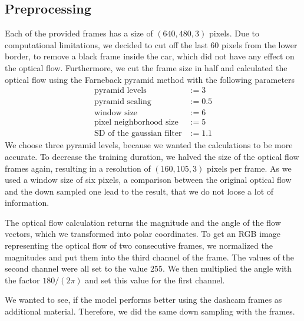 \documentclass[conference]{IEEEtran}
\begin{document}
\subsection{Preprocessing}
Each of the provided frames has a size of $(640,480,3)$ pixels. Due to computational limitations, we decided to cut off the last 60 pixels from the lower border, to remove a black frame inside the car, which did not have any effect on the optical flow. Furthermore, we cut the frame size in half and calculated the optical flow using the Farneback pyramid \cite{Farneback2003} method with the following parameters
\begin{align*}
\text{pyramid levels} &:= 3\\
\text{pyramid scaling} &:= 0.5\\
\text{window size} &:= 6\\
\text{pixel neighborhood size} &:= 5\\
\text{SD of the gaussian filter} &:= 1.1
\end{align*}
We choose three pyramid levels, because we wanted the calculations to be more accurate. To decrease the training duration, we halved 
the size of the optical flow frames again, resulting in a resolution of
$(160,105,3)$ pixels per frame. As we used a window size of six pixels, a comparison between the original optical flow and the down 
sampled one lead to the result, that we do not loose a lot of information.

The optical flow calculation returns the magnitude and
the angle of the flow vectors, which we transformed into polar coordinates. To get an RGB image representing the
optical flow of two consecutive frames, we normalized the magnitudes and put them into the third channel of the frame. The values
of the second channel were all set to the value $255$. We then multiplied the angle with the factor $180/(2\pi)$ and set this value 
for the first channel.

We wanted to see, if the model performs better using the dashcam frames as additional material. Therefore, we did the same down 
sampling with the frames.

\end{document}
